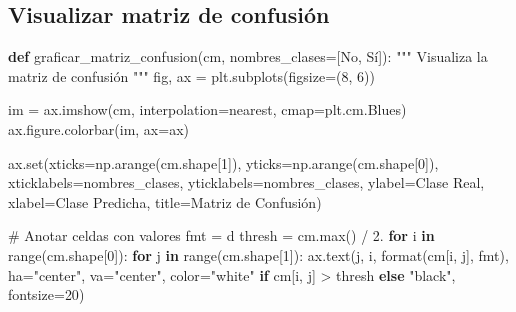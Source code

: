 \documentclass[
  doc,
  floatsintext,
  longtable,
  a4paper,
  nolmodern,
  notxfonts,
  notimes,
  12pt,
  colorlinks=true,linkcolor=blue,citecolor=blue,urlcolor=blue]{apa7}
\newenvironment{Shaded}{\begin{snugshade}}{\end{snugshade}}
\newcommand{\BuiltInTok}[1]{\textcolor[rgb]{0.00,0.23,0.31}{#1}}
\newcommand{\CommentTok}[1]{\textcolor[rgb]{0.37,0.37,0.37}{#1}}
\newcommand{\ControlFlowTok}[1]{\textcolor[rgb]{0.00,0.23,0.31}{\textbf{#1}}}
\newcommand{\DecValTok}[1]{\textcolor[rgb]{0.68,0.00,0.00}{#1}}
\newcommand{\FloatTok}[1]{\textcolor[rgb]{0.68,0.00,0.00}{#1}}
\newcommand{\KeywordTok}[1]{\textcolor[rgb]{0.00,0.23,0.31}{\textbf{#1}}}
\newcommand{\NormalTok}[1]{\textcolor[rgb]{0.00,0.23,0.31}{#1}}
\newcommand{\OperatorTok}[1]{\textcolor[rgb]{0.37,0.37,0.37}{#1}}
\newcommand{\StringTok}[1]{\textcolor[rgb]{0.13,0.47,0.30}{#1}}
\begin{document}
\subsection{Visualizar matriz de
confusión}\label{visualizar-matriz-de-confusiuxf3n}

\begin{Shaded}
\begin{Highlighting}[]
\KeywordTok{def}\NormalTok{ graficar\_matriz\_confusion(cm, nombres\_clases}\OperatorTok{=}\NormalTok{[}\StringTok{\textquotesingle{}No\textquotesingle{}}\NormalTok{, }\StringTok{\textquotesingle{}Sí\textquotesingle{}}\NormalTok{]):}
    \CommentTok{"""}
\CommentTok{    Visualiza la matriz de confusión}
\CommentTok{    """}
\NormalTok{    fig, ax }\OperatorTok{=}\NormalTok{ plt.subplots(figsize}\OperatorTok{=}\NormalTok{(}\DecValTok{8}\NormalTok{, }\DecValTok{6}\NormalTok{))}
    
\NormalTok{    im }\OperatorTok{=}\NormalTok{ ax.imshow(cm, interpolation}\OperatorTok{=}\StringTok{\textquotesingle{}nearest\textquotesingle{}}\NormalTok{, cmap}\OperatorTok{=}\NormalTok{plt.cm.Blues)}
\NormalTok{    ax.figure.colorbar(im, ax}\OperatorTok{=}\NormalTok{ax)}
    
\NormalTok{    ax.}\BuiltInTok{set}\NormalTok{(xticks}\OperatorTok{=}\NormalTok{np.arange(cm.shape[}\DecValTok{1}\NormalTok{]),}
\NormalTok{           yticks}\OperatorTok{=}\NormalTok{np.arange(cm.shape[}\DecValTok{0}\NormalTok{]),}
\NormalTok{           xticklabels}\OperatorTok{=}\NormalTok{nombres\_clases,}
\NormalTok{           yticklabels}\OperatorTok{=}\NormalTok{nombres\_clases,}
\NormalTok{           ylabel}\OperatorTok{=}\StringTok{\textquotesingle{}Clase Real\textquotesingle{}}\NormalTok{,}
\NormalTok{           xlabel}\OperatorTok{=}\StringTok{\textquotesingle{}Clase Predicha\textquotesingle{}}\NormalTok{,}
\NormalTok{           title}\OperatorTok{=}\StringTok{\textquotesingle{}Matriz de Confusión\textquotesingle{}}\NormalTok{)}
    
    \CommentTok{\# Anotar celdas con valores}
\NormalTok{    fmt }\OperatorTok{=} \StringTok{\textquotesingle{}d\textquotesingle{}}
\NormalTok{    thresh }\OperatorTok{=}\NormalTok{ cm.}\BuiltInTok{max}\NormalTok{() }\OperatorTok{/} \FloatTok{2.}
    \ControlFlowTok{for}\NormalTok{ i }\KeywordTok{in} \BuiltInTok{range}\NormalTok{(cm.shape[}\DecValTok{0}\NormalTok{]):}
        \ControlFlowTok{for}\NormalTok{ j }\KeywordTok{in} \BuiltInTok{range}\NormalTok{(cm.shape[}\DecValTok{1}\NormalTok{]):}
\NormalTok{            ax.text(j, i, }\BuiltInTok{format}\NormalTok{(cm[i, j], fmt),}
\NormalTok{                   ha}\OperatorTok{=}\StringTok{"center"}\NormalTok{, va}\OperatorTok{=}\StringTok{"center"}\NormalTok{,}
\NormalTok{                   color}\OperatorTok{=}\StringTok{"white"} \ControlFlowTok{if}\NormalTok{ cm[i, j] }\OperatorTok{\textgreater{}}\NormalTok{ thresh }\ControlFlowTok{else} \StringTok{"black"}\NormalTok{,}
\NormalTok{                   fontsize}\OperatorTok{=}\DecValTok{20}\NormalTok{)}
    

\end{Highlighting}
\end{Shaded}
\end{document}
